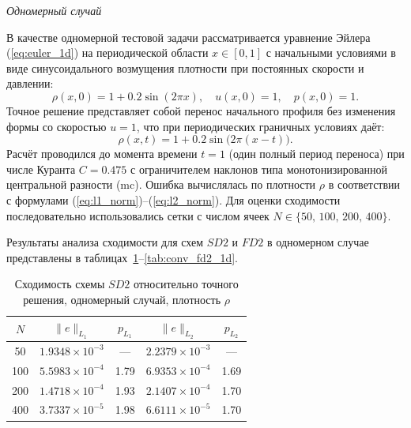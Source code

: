 \documentclass[a4paper,14pt]{extarticle}
\theoremstyle{theorem}
\theoremstyle{lemma}
\begin{document}
\textit{Одномерный случай}

В качестве одномерной тестовой задачи рассматривается уравнение Эйлера
(\ref{eq:euler_1d}) на периодической области $x \in [0, 1]$ с начальными
условиями в виде синусоидального возмущения плотности при постоянных скорости
и давлении:
{%
    \setlength{\abovedisplayskip}{2pt}%
    \setlength{\abovedisplayshortskip}{2pt}%
\begin{equation}
    \label{eq:smooth_1d_ic}
    \rho(x, 0) = 1 + 0.2\sin(2\pi x), \quad u(x, 0) = 1, \quad p(x, 0) = 1.
\end{equation}}
Точное решение представляет собой перенос начального профиля без изменения формы
со скоростью $u = 1$, что при периодических граничных условиях даёт:
{%
    \setlength{\abovedisplayskip}{2pt}%
    \setlength{\abovedisplayshortskip}{2pt}%
\begin{equation}
    \label{eq:smooth_1d_exact}
    \rho(x, t) = 1 + 0.2\sin\bigl(2\pi(x - t)\bigr).
\end{equation}}
Расчёт проводился до момента времени $t = 1$ (один полный период переноса)
при числе Куранта $C = 0.475$ с ограничителем наклонов типа монотонизированной
центральной разности (mc). Ошибка вычислялась по плотности $\rho$
в соответствии с формулами (\ref{eq:l1_norm})--(\ref{eq:l2_norm}).
Для оценки сходимости последовательно использовались сетки с числом ячеек
$N \in \{50,\, 100,\, 200,\, 400\}$.

Результаты анализа сходимости для схем $SD2$ и $FD2$ в одномерном
случае представлены в таблицах~\ref{tab:conv_sd2_1d}--\ref{tab:conv_fd2_1d}.

\begin{table}[!htbp]
\centering
\caption{Сходимость схемы $SD2$ относительно точного решения, одномерный случай, плотность $\rho$}
\vspace{0.1cm}
\label{tab:conv_sd2_1d}
\begin{tabular}{ccccc}
\toprule
$N$ & $\|e\|_{L_1}$ & $p_{L_1}$ & $\|e\|_{L_2}$ & $p_{L_2}$ \\
\midrule
50  & $1.9348\times 10^{-3}$ & ---  & $2.2379\times 10^{-3}$ & ---  \\
100 & $5.5983\times 10^{-4}$ & 1.79 & $6.9353\times 10^{-4}$ & 1.69 \\
200 & $1.4718\times 10^{-4}$ & 1.93 & $2.1407\times 10^{-4}$ & 1.70 \\
400 & $3.7337\times 10^{-5}$ & 1.98 & $6.6111\times 10^{-5}$ & 1.70 \\
\bottomrule
\end{tabular}
\end{table}
\end{document}
